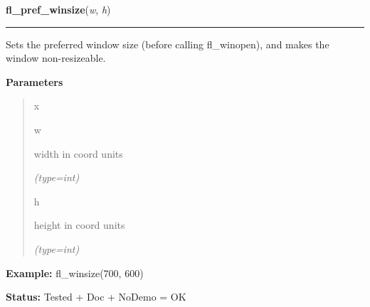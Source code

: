 \hspace{.8\funcindent}\begin{boxedminipage}{\funcwidth}

    \raggedright \textbf{fl\_pref\_winsize}(\textit{w}, \textit{h})

    \vspace{-1.5ex}

    \rule{\textwidth}{0.5\fboxrule}
\setlength{\parskip}{2ex}
    Sets the preferred window size (before calling fl\_winopen), and makes 
    the window non-resizeable.

\setlength{\parskip}{1ex}
      \textbf{Parameters}
      \vspace{-1ex}

      \begin{quote}
        \begin{Ventry}{x}

          \item[w]

          width in coord units

            {\it (type=int)}

          \item[h]

          height in coord units

            {\it (type=int)}

        \end{Ventry}

      \end{quote}

\textbf{Example:} fl\_winsize(700, 600)



\textbf{Status:} Tested + Doc + NoDemo = OK



    \end{boxedminipage}

    \label{xformslib:flxbasic:fl_initial_winsize}

    \vspace{0.5ex}

